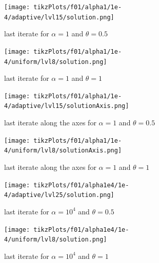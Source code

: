 \documentclass[draft=false,twoside,12pt]{scrreprt}
\begin{document}

\begin{minipage}[t]{0.45\textwidth}
  \begin{figure}[H]
	  \centering
		\texttt{[image: tikzPlots/f01/alpha1/1e-4/adaptive/lvl15/solution.png]} 
    \caption{last iterate for $\alpha=1$ and $\theta = 0.5$}
  \end{figure}
\end{minipage}
\hfill
\vline
\hfill
\begin{minipage}[t]{0.45\textwidth}
  \begin{figure}[H]
	  \centering
		\texttt{[image: tikzPlots/f01/alpha1/1e-4/uniform/lvl8/solution.png]} 
    \caption{last iterate for $\alpha=1$ and $\theta = 1$}
  \end{figure}
\end{minipage}

\vspace{-\parskip}
\begin{minipage}[t]{0.45\textwidth}
  \begin{figure}[H]
	  \centering
		\texttt{[image: tikzPlots/f01/alpha1/1e-4/adaptive/lvl15/solutionAxis.png]} 
    \caption{last iterate along the axes for $\alpha=1$ and $\theta = 0.5$}
  \end{figure}
\end{minipage}
\hfill
\vline
\hfill
\begin{minipage}[t]{0.45\textwidth}
  \begin{figure}[H]
	  \centering
		\texttt{[image: tikzPlots/f01/alpha1/1e-4/uniform/lvl8/solutionAxis.png]} 
    \caption{last iterate along the axes for $\alpha=1$ and $\theta = 1$}
  \end{figure}
\end{minipage}

\begin{minipage}[t]{0.45\textwidth}
  \begin{figure}[H]
	  \centering
		\texttt{[image: tikzPlots/f01/alpha1e4/1e-4/adaptive/lvl25/solution.png]} 
    \caption{last iterate for $\alpha=10^4$ and $\theta = 0.5$}
  \end{figure}
\end{minipage}
\hfill
\vline
\hfill
\begin{minipage}[t]{0.45\textwidth}
  \begin{figure}[H]
	  \centering
		\texttt{[image: tikzPlots/f01/alpha1e4/1e-4/uniform/lvl8/solution.png]} 
    \caption{last iterate for $\alpha=10^4$ and $\theta = 1$}
  \end{figure}
\end{minipage}
\end{document}
